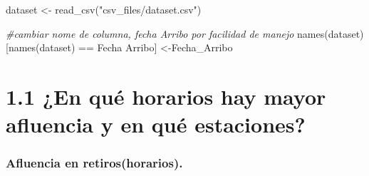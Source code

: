 \documentclass[
]{article}
\newenvironment{Shaded}{\begin{snugshade}}{\end{snugshade}}
\newcommand{\AttributeTok}[1]{\textcolor[rgb]{0.77,0.63,0.00}{#1}}
\newcommand{\CommentTok}[1]{\textcolor[rgb]{0.56,0.35,0.01}{\textit{#1}}}
\newcommand{\ConstantTok}[1]{\textcolor[rgb]{0.00,0.00,0.00}{#1}}
\newcommand{\DecValTok}[1]{\textcolor[rgb]{0.00,0.00,0.81}{#1}}
\newcommand{\FunctionTok}[1]{\textcolor[rgb]{0.00,0.00,0.00}{#1}}
\newcommand{\NormalTok}[1]{#1}
\newcommand{\OtherTok}[1]{\textcolor[rgb]{0.56,0.35,0.01}{#1}}
\newcommand{\SpecialCharTok}[1]{\textcolor[rgb]{0.00,0.00,0.00}{#1}}
\newcommand{\StringTok}[1]{\textcolor[rgb]{0.31,0.60,0.02}{#1}}
\begin{document}
\begin{Shaded}
\begin{Highlighting}[]
\NormalTok{dataset }\OtherTok{\textless{}{-}} \FunctionTok{read\_csv}\NormalTok{(}\StringTok{"csv\_files/dataset.csv"}\NormalTok{)}

\CommentTok{\#cambiar nome de columna, fecha Arribo por facilidad de manejo}
\FunctionTok{names}\NormalTok{(dataset)[}\FunctionTok{names}\NormalTok{(dataset) }\SpecialCharTok{==} \StringTok{\textquotesingle{}Fecha Arribo\textquotesingle{}}\NormalTok{] }\OtherTok{\textless{}{-}}\StringTok{\textquotesingle{}Fecha\_Arribo\textquotesingle{}}
\end{Highlighting}
\end{Shaded}

\hypertarget{en-quuxe9-horarios-hay-mayor-afluencia-y-en-quuxe9-estaciones}{%
\section{1.1 ¿En qué horarios hay mayor afluencia y en qué
estaciones?}\label{en-quuxe9-horarios-hay-mayor-afluencia-y-en-quuxe9-estaciones}}

\hypertarget{afluencia-en-retiroshorarios.}{%
\subsubsection{Afluencia en
retiros(horarios).}\label{afluencia-en-retiroshorarios.}}

\begin{Shaded}
\end{Shaded}
\end{document}
